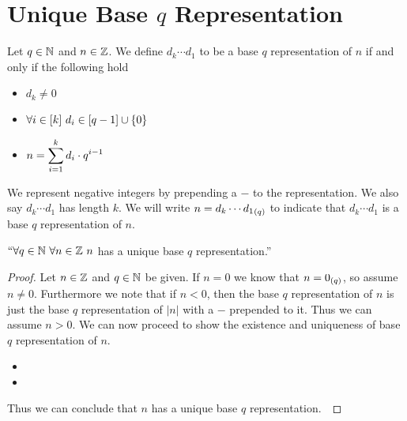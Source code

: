     \section{Unique Base $q$ Representation}
        \begin{definition}
            Let $q \in \mathbb{N}$ and $n \in \mathbb{Z}$. We define $d_k\cdots d_1$ to be a base
            $q$ representation of $n$ if and only if the following hold
            \begin{itemize}
                \item
                    $d_k \neq 0$
                \item
                    $\forall i \in [k] \ d_i \in [q - 1] \cup \left\{0\right\}$
                \item
                    $n = \displaystyle\sum_{i = 1}^k d_i \cdot q^{i - 1}$
            \end{itemize}
            We represent negative integers by prepending a $-$ to the representation. We also
            say $d_k\cdots d_1$ has length $k$. We will write $n = {d_k \cdots d_1}_{(q)}$ to indicate that
            $d_k \cdots d_1$ is a base $q$ representation of $n$.
        \end{definition}
        \begin{theorem}
            $``\forall q \in \mathbb{N} \ \forall n \in \mathbb{Z} \ n$ has a unique base $q$ representation.''
        \end{theorem}
        \begin{proof}
            Let $n \in \mathbb{Z}$ and $q \in \mathbb{N}$ be given. If $n = 0$ we know that
            $n = {0}_{(q)}$, so assume $n \neq 0$. Furthermore we note that if $n < 0$,
            then the base $q$ representation of $n$ is just the base $q$ representation of $|n|$
            with a $-$ prepended to it. Thus we can assume $n > 0$. We can now proceed to show
            the existence and uniqueness of base $q$ representation of $n$.
            \begin{itemize}
                \item
                \item
            \end{itemize}
            Thus we can conclude that $n$ has a unique base $q$ representation.~\QED
        \end{proof}
